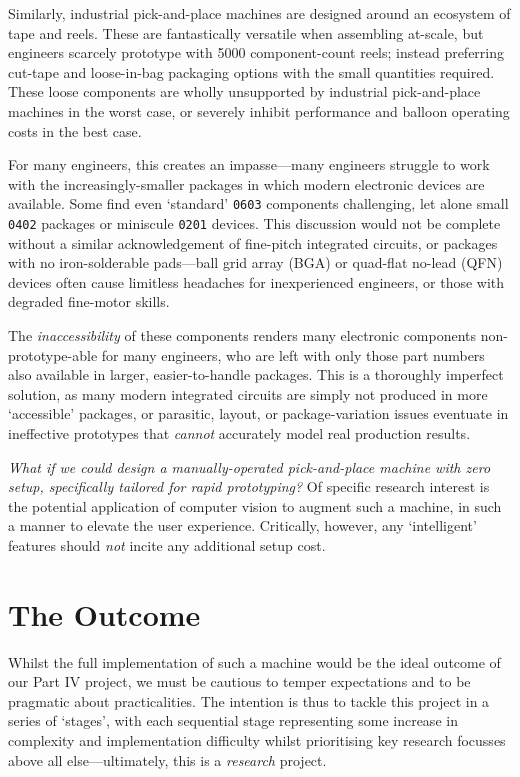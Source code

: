 \documentclass [11pt]{article}
\begin{document}
Similarly, industrial pick-and-place machines are designed around an ecosystem of tape and reels.
These are fantastically versatile when assembling at-scale, but engineers scarcely prototype with 5000 component-count reels; instead preferring cut-tape and loose-in-bag packaging options with the small quantities required.
These loose components are wholly unsupported by industrial pick-and-place machines in the worst case, or severely inhibit performance and balloon operating costs in the best case.

For many engineers, this creates an impasse—many engineers struggle to work with the increasingly-smaller packages in which modern electronic devices are available.
Some find even `standard' \texttt{0603} components challenging, let alone small \texttt{0402} packages or miniscule \texttt{0201} devices.
This discussion would not be complete without a similar acknowledgement of fine-pitch integrated circuits, or packages with no iron-solderable pads—ball grid array (BGA) or quad-flat no-lead (QFN) devices often cause limitless headaches for inexperienced engineers, or those with degraded fine-motor skills.

The \emph{inaccessibility} of these components renders many electronic components non-prototype-able for many engineers, who are left with only those part numbers also available in larger, easier-to-handle packages.
This is a thoroughly imperfect solution, as many modern integrated circuits are simply not produced in more `accessible' packages, or parasitic, layout, or package-variation issues eventuate in ineffective prototypes that \emph{cannot} accurately model real production results.

\emph{What if we could design a manually-operated pick-and-place machine with zero setup, specifically tailored for rapid prototyping?}
Of specific research interest is the potential application of computer vision to augment such a machine, in such a manner to elevate the user experience.
Critically, however, any `intelligent' features should \emph{not} incite any additional setup cost.

\section{The Outcome}

Whilst the full implementation of such a machine would be the ideal outcome of our Part IV project, we must be cautious to temper expectations and to be pragmatic about practicalities.
The intention is thus to tackle this project in a series of `stages', with each sequential stage representing some increase in complexity and implementation difficulty whilst prioritising key research focusses above all else—ultimately, this is a \emph{research} project.
\end{document}
